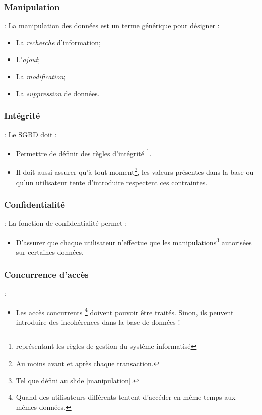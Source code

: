 \documentclass[10pt]{beamer}
\begin{document}
\subsubsection{Manipulation}
\begin{frame}{\subsecname : \subsubsecname}
    \label{manipulation}
    La manipulation des données est un terme générique pour désigner :
    \begin{itemize}
        \item La \emph{recherche} d’information;
        \item L'\emph{ajout};
        \item La \emph{modification};
        \item La \emph{suppression} de données.
    \end{itemize}
\end{frame}

\subsubsection{Intégrité}
\begin{frame}{\subsecname : \subsubsecname}
    Le SGBD doit :
    \begin{itemize}
        \item Permettre de définir des règles d’intégrité \footnote{représentant les règles de gestion du système informatisé}.
        \item Il doit aussi assurer qu’à tout moment\footnote{Au moins avant et après chaque transaction.}, les valeurs présentes dans la base ou qu’un utilisateur tente d’introduire respectent ces contraintes.
    \end{itemize}
\end{frame}

\subsubsection{Confidentialité}
\begin{frame}{\subsecname : \subsubsecname}
    La fonction de confidentialité permet :
    \begin{itemize}
        \item D’assurer que chaque utilisateur n’effectue que les manipulations\footnote{Tel que défini au slide \ref{manipulation}.} autorisées sur certaines données.
    \end{itemize}
\end{frame}


\subsubsection{Concurrence d’accès}
\begin{frame}{\subsecname : \subsubsecname}
    \begin{itemize}
        \item Les accès concurrents \footnote{Quand des utilisateurs différents tentent d’accéder en même temps aux mêmes données.} doivent pouvoir être traités. Sinon, ils peuvent introduire des incohérences dans la base de données !
    \end{itemize}
\end{frame}
\end{document}
